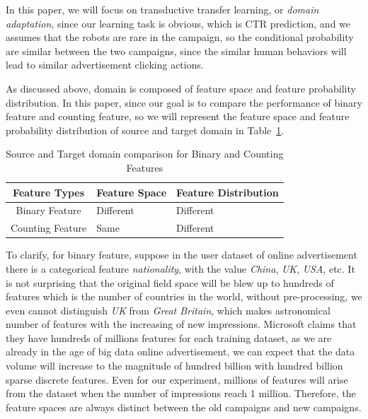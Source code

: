 In this paper, we will focus on transductive transfer learning, or \textit{domain adaptation}, since our learning task is obvious, which is CTR prediction, and we assumes that the robots are rare in the campaign, so the conditional probability are similar between the two campaigns, since the similar human behaviors will lead to similar advertisement clicking actions. 

As discussed above, domain is composed of feature space and feature probability distribution. In this paper, since our goal is to compare the performance of binary feature and counting feature, so we will represent the feature space and feature probability distribution of source and target domain in Table~\ref{tab:domainadapt}.

\begin{table}[h]
\centering
\begin{tabular}{ c | l | l }
Feature Types & Feature Space & Feature Distribution \\
\hline \hline
Binary Feature & Different & Different  \\
Counting Feature & Same & Different
\end{tabular}
\caption{Source and Target domain comparison for Binary and Counting Features}
\label{tab:domainadapt}
\end{table}

To clarify, for binary feature, suppose in the user dataset of online advertisement there is a categorical feature \textit{nationality}, with the value \textit{China}, \textit{UK}, \textit{USA}, etc. It is not surprising that the original field space will be blew up to hundreds of features which is the number of countries in the world, without pre-processing, we even cannot distinguish \textit{UK} from \textit{Great Britain}, which makes astronomical number of features with the increasing of new impressions. Microsoft claims that they have hundreds of millions features \cite{graepel2010web} for each training dataset, as we are already in the age of big data online advertisement, we can expect that the data volume will increase to the magnitude of hundred billion with hundred billion sparse discrete features. Even for our experiment, millions of features will arise from the dataset when the number of impressions reach 1 million. Therefore, the feature spaces are always distinct between the old campaigns and new campaigns. 


